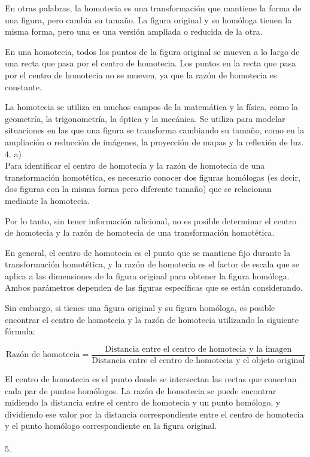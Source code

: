 \documentclass{article}
\begin{document}
En otras palabras, la homotecia es una transformación que mantiene la forma de una figura, pero cambia su tamaño. La figura original y su homóloga tienen la misma forma, pero una es una versión ampliada o reducida de la otra.

En una homotecia, todos los puntos de la figura original se mueven a lo largo de una recta que pasa por el centro de homotecia. Los puntos en la recta que pasa por el centro de homotecia no se mueven, ya que la razón de homotecia es constante.

La homotecia se utiliza en muchos campos de la matemática y la física, como la geometría, la trigonometría, la óptica y la mecánica. Se utiliza para modelar situaciones en las que una figura se transforma cambiando su tamaño, como en la ampliación o reducción de imágenes, la proyección de mapas y la reflexión de luz.
\\
{\Large 4. a)}
\\
Para identificar el centro de homotecia y la razón de homotecia de una transformación homotética, es necesario conocer dos figuras homólogas (es decir, dos figuras con la misma forma pero diferente tamaño) que se relacionan mediante la homotecia.

Por lo tanto, sin tener información adicional, no es posible determinar el centro de homotecia y la razón de homotecia de una transformación homotética.

En general, el centro de homotecia es el punto que se mantiene fijo durante la transformación homotética, y la razón de homotecia es el factor de escala que se aplica a las dimensiones de la figura original para obtener la figura homóloga. Ambos parámetros dependen de las figuras específicas que se están considerando.

Sin embargo, si tienes una figura original y su figura homóloga, es posible encontrar el centro de homotecia y la razón de homotecia utilizando la siguiente fórmula:

$$\text{Razón de homotecia} = \frac{\text{Distancia entre el centro de homotecia y la imagen}}{\text{Distancia entre el centro de homotecia y el objeto original}}$$

El centro de homotecia es el punto donde se intersectan las rectas que conectan cada par de puntos homólogos. La razón de homotecia se puede encontrar midiendo la distancia entre el centro de homotecia y un punto homólogo, y dividiendo ese valor por la distancia correspondiente entre el centro de homotecia y el punto homólogo correspondiente en la figura original.
\\
\\
{\Large 5.}
\end{document}
